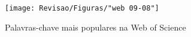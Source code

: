 \begin{figure}[htpb!]
	\centering
	\caption{Palavras-chave mais populares na Web of Science}
	\label{fig:web-09-08}
	\texttt{[image: Revisao/Figuras/"web 09-08"]}
	
	
	
\end{figure}